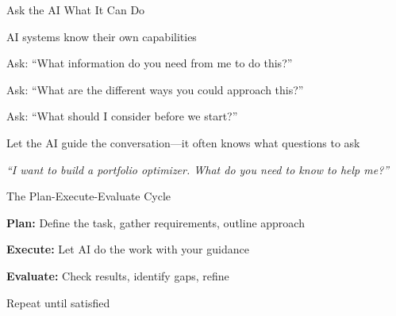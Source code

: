 \documentclass[aspectratio=169]{beamer}
\begin{document}
\begin{frame}{Ask the AI What It Can Do}
\begin{baritemize}
  \item AI systems know their own capabilities
  \item Ask: ``What information do you need from me to do this?''
  \item Ask: ``What are the different ways you could approach this?''
  \item Ask: ``What should I consider before we start?''
  \item Let the AI \alert{guide the conversation}---it often knows what questions to ask
\end{baritemize}

\vspace{0.5cm}
\begin{shadedbox}
\centerline{\textit{``I want to build a portfolio optimizer. What do you need to know to help me?''}}
\end{shadedbox}
\end{frame}


\begin{frame}{The Plan-Execute-Evaluate Cycle}
\begin{center}
\end{center}

\begin{baritemize}
  \item \textbf{Plan:} Define the task, gather requirements, outline approach
  \item \textbf{Execute:} Let AI do the work with your guidance
  \item \textbf{Evaluate:} Check results, identify gaps, refine
  \item Repeat until satisfied
\end{baritemize}
\end{frame}
\end{document}
